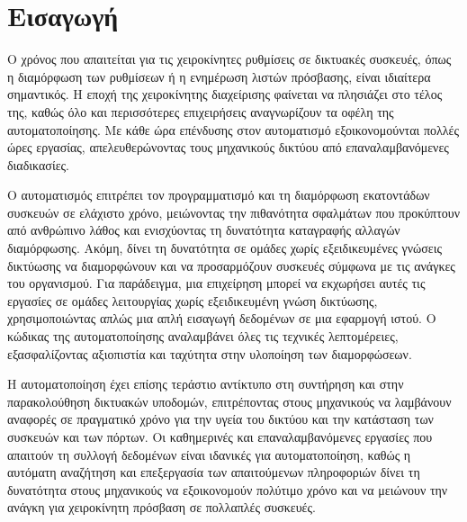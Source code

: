 \chapter{Εισαγωγή}

Ο χρόνος που απαιτείται για τις χειροκίνητες ρυθμίσεις σε δικτυακές συσκευές, όπως η διαμόρφωση των ρυθμίσεων ή η 
ενημέρωση λιστών πρόσβασης, είναι ιδιαίτερα σημαντικός. Η εποχή της χειροκίνητης διαχείρισης φαίνεται να πλησιάζει στο τέλος της, καθώς όλο και 
περισσότερες επιχειρήσεις αναγνωρίζουν τα οφέλη της αυτοματοποίησης. Με κάθε ώρα επένδυσης στον αυτοματισμό εξοικονομούνται πολλές ώρες εργασίας, 
απελευθερώνοντας τους μηχανικούς δικτύου από επαναλαμβανόμενες διαδικασίες.

Ο αυτοματισμός επιτρέπει τον προγραμματισμό και τη διαμόρφωση εκατοντάδων συσκευών σε ελάχιστο χρόνο, μειώνοντας την πιθανότητα 
σφαλμάτων που προκύπτουν από ανθρώπινο λάθος και ενισχύοντας τη δυνατότητα καταγραφής αλλαγών διαμόρφωσης. Ακόμη, δίνει τη δυνατότητα σε ομάδες χωρίς 
εξειδικευμένες γνώσεις δικτύωσης να διαμορφώνουν και να προσαρμόζουν συσκευές σύμφωνα με τις ανάγκες του οργανισμού. Για παράδειγμα, μια επιχείρηση μπορεί 
να εκχωρήσει αυτές τις εργασίες σε ομάδες λειτουργίας χωρίς εξειδικευμένη γνώση δικτύωσης, χρησιμοποιώντας απλώς μια απλή εισαγωγή δεδομένων σε μια εφαρμογή 
ιστού. Ο κώδικας της αυτοματοποίησης αναλαμβάνει όλες τις τεχνικές λεπτομέρειες, εξασφαλίζοντας αξιοπιστία και ταχύτητα στην υλοποίηση των διαμορφώσεων.

Η αυτοματοποίηση έχει επίσης τεράστιο αντίκτυπο στη συντήρηση και στην παρακολούθηση δικτυακών υποδομών, επιτρέποντας στους μηχανικούς να 
λαμβάνουν αναφορές σε πραγματικό χρόνο για την υγεία του δικτύου και την κατάσταση των συσκευών και των πόρτων. Οι καθημερινές και επαναλαμβανόμενες 
εργασίες που απαιτούν τη συλλογή δεδομένων είναι ιδανικές για αυτοματοποίηση, καθώς η αυτόματη αναζήτηση και επεξεργασία των απαιτούμενων πληροφοριών 
δίνει τη δυνατότητα στους μηχανικούς να εξοικονομούν πολύτιμο χρόνο και να μειώνουν την ανάγκη για χειροκίνητη πρόσβαση σε πολλαπλές συσκευές.

